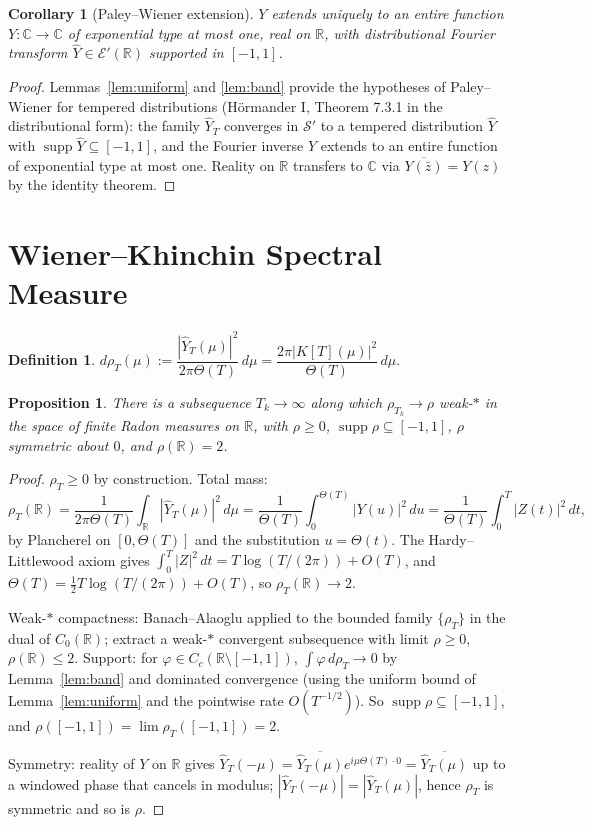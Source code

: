 \documentclass[11pt,a4paper]{article}
\theoremstyle{plain}
\newtheorem{proposition}[theorem]{Proposition}
\newtheorem{corollary}[theorem]{Corollary}
\theoremstyle{definition}
\newtheorem{definition}[theorem]{Definition}
\theoremstyle{remark}
\newcommand{\R}{\mathbb{R}}
\newcommand{\C}{\mathbb{C}}
\DeclareMathOperator{\supp}{supp}
\begin{document}
\begin{corollary}[Paley--Wiener extension]\label{cor:PW}
$Y$ extends uniquely to an entire function $Y:\C\to\C$ of exponential type at most one, real on $\R$, with distributional Fourier transform $\hat Y\in\mathcal E'(\R)$ supported in $[-1,1]$.
\end{corollary}

\begin{proof}
Lemmas~\ref{lem:uniform} and \ref{lem:band} provide the hypotheses of Paley--Wiener for tempered distributions (Hörmander I, Theorem 7.3.1 in the distributional form): the family $\hat Y_T$ converges in $\mathcal S'$ to a tempered distribution $\hat Y$ with $\supp\hat Y\subseteq[-1,1]$, and the Fourier inverse $Y$ extends to an entire function of exponential type at most one. Reality on $\R$ transfers to $\C$ via $\overline{Y(\bar z)}=Y(z)$ by the identity theorem.
\end{proof}

\section{Wiener--Khinchin Spectral Measure}

\begin{definition}\label{def:rhoT}
$d\rho_T(\mu):=\dfrac{|\hat Y_T(\mu)|^2}{2\pi\Theta(T)}\,d\mu=\dfrac{2\pi|K[T](\mu)|^2}{\Theta(T)}\,d\mu$.
\end{definition}

\begin{proposition}\label{prop:WK}
There is a subsequence $T_k\to\infty$ along which $\rho_{T_k}\to\rho$ weak-$*$ in the space of finite Radon measures on $\R$, with $\rho\ge 0$, $\supp\rho\subseteq[-1,1]$, $\rho$ symmetric about $0$, and $\rho(\R)=2$.
\end{proposition}

\begin{proof}
$\rho_T\ge 0$ by construction. Total mass:
\[
\rho_T(\R)=\frac{1}{2\pi\Theta(T)}\int_\R|\hat Y_T(\mu)|^2\,d\mu=\frac{1}{\Theta(T)}\int_0^{\Theta(T)}|Y(u)|^2\,du=\frac{1}{\Theta(T)}\int_0^T|Z(t)|^2\,dt,
\]
by Plancherel on $[0,\Theta(T)]$ and the substitution $u=\Theta(t)$. The Hardy--Littlewood axiom gives $\int_0^T|Z|^2\,dt=T\log(T/(2\pi))+O(T)$, and $\Theta(T)=\tfrac12 T\log(T/(2\pi))+O(T)$, so $\rho_T(\R)\to 2$.

Weak-$*$ compactness: Banach--Alaoglu applied to the bounded family $\{\rho_T\}$ in the dual of $C_0(\R)$; extract a weak-$*$ convergent subsequence with limit $\rho\ge 0$, $\rho(\R)\le 2$. Support: for $\varphi\in C_c(\R\setminus[-1,1])$, $\int\varphi\,d\rho_T\to 0$ by Lemma~\ref{lem:band} and dominated convergence (using the uniform bound of Lemma~\ref{lem:uniform} and the pointwise rate $O(T^{-1/2})$). So $\supp\rho\subseteq[-1,1]$, and $\rho([-1,1])=\lim\rho_T([-1,1])=2$.

Symmetry: reality of $Y$ on $\R$ gives $\hat Y_T(-\mu)=\overline{\hat Y_T(\mu)}e^{i\mu\Theta(T)\cdot 0}=\overline{\hat Y_T(\mu)}$ up to a windowed phase that cancels in modulus; $|\hat Y_T(-\mu)|=|\hat Y_T(\mu)|$, hence $\rho_T$ is symmetric and so is $\rho$.
\end{proof}
\end{document}
